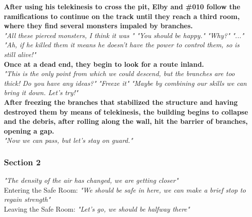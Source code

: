 \begin{dialogue}
	\textbf{After using his telekinesis to cross the pit, Elby and \#010 follow the ramifications to continue on the track until they reach a third room, where they find several monsters impaled by branches.}\\
	
	
	 \textit{"All these pierced monsters, I think it was "}
	 \textit{"You should be happy."}
	 \textit{"Why?"}
	 \textit{"..."}
	 \textit{"Ah, if he killed them it means he doesn't have the power to control them, so  is still alive!"}
	 \\
	
	
	\textbf{Once at a dead end, they begin to look for a route inland.}\\
	
	
	 \textit{"This is the only point from which we could descend, but the branches are too thick! Do you have any ideas?"}
	 
	 
	 \textit{"Freeze it"}
	  \textit{"Maybe by combining our skills we can bring it down. Let's try!"}\\
	
	
	\textbf{After freezing the branches that stabilized the structure and having destroyed them by means of telekinesis, the building begins to collapse and the debris, after rolling along the wall, hit the barrier of branches, opening a gap.}\\
	
	
	 \textit{"Now we can pass, but let's stay on guard."}
	
\end{dialogue}


\subsubsection{Section 2}
\vspace*{0.3cm}

\begin{dialogue}
	 
	 \textit{"The density of the air has changed, we are getting closer"}\\
	
	Entering the Safe Room:
	 \textit{"We should be safe in here, we can make a brief stop to regain strength"}\\
	
	Leaving the Safe Room:
	 \textit{"Let's go, we should be halfway there"}
\end{dialogue}


